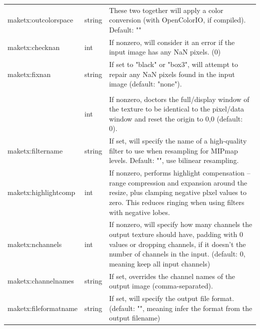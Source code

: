 \begin{longtable}{ >{\spc \cf\small}p{1.8in} >{\cf\small}l p{3in}}
   {\small maketx:outcolorspace} & string &
                          These two together will apply a color conversion
                              (with OpenColorIO, if compiled). Default: "" \\
   maketx:checknan & int &   If nonzero, will consider it an error if the
                              input image has any NaN pixels. (0) \\
   maketx:fixnan & string & If set to "black" or "box3", will attempt
                              to repair any NaN pixels found in the
                              input image (default: "none"). \\
   \multicolumn{2}{l}{\spc \cf\small maketx:set_full_to_pixels} \\ & int &
                          If nonzero, doctors the full/display window
                              of the texture to be identical to the
                              pixel/data window and reset the origin
                              to 0,0 (default: 0). \\
   maketx:filtername & string &
                          If set, will specify the name of a high-quality
                             filter to use when resampling for MIPmap
                             levels. Default: "", use bilinear resampling. \\
   maketx:highlightcomp & int &
                          If nonzero, performs highlight compensation --
                             range compression and expansion around 
                             the resize, plus clamping negative plxel
                             values to zero. This reduces ringing when
                             using filters with negative lobes. \\
   maketx:nchannels & int &  If nonzero, will specify how many channels
                             the output texture should have, padding with
                             0 values or dropping channels, if it doesn't
                             the number of channels in the input.
                             (default: 0, meaning keep all input channels) \\
   maketx:channelnames & string &
                          If set, overrides the channel names of the
                             output image (comma-separated). \\
   {\small maketx:fileformatname} & string &
                          If set, will specify the output file format.
                              (default: "", meaning infer the format from
                              the output filename) \\

\end{longtable}
